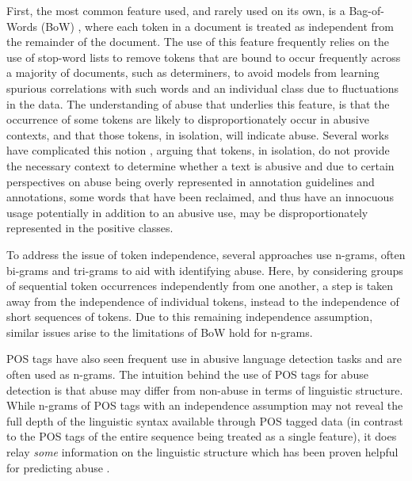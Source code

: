 First, the most common feature used, and rarely used on its own, is a Bag-of-Words (BoW) \citep{Fortuna:2018,Davidson:2017}, where each token in a document is treated as independent from the remainder of the document. The use of this feature frequently relies on the use of stop-word lists to remove tokens that are bound to occur frequently across a majority of documents, such as determiners, to avoid models from learning spurious correlations with such words and an individual class due to fluctuations in the data. The understanding of abuse that underlies this feature, is that the occurrence of some tokens are likely to disproportionately occur in abusive contexts, and that those tokens, in isolation, will indicate abuse. Several works have complicated this notion \citep[e.g.]{Waseem:2018,Davidson:2019}, arguing that tokens, in isolation, do not provide the necessary context to determine whether a text is abusive and due to certain perspectives on abuse being overly represented \citep{Waseem:2016} in annotation guidelines and annotations, some words that have been reclaimed, and thus have an innocuous usage potentially in addition to an abusive use, may be disproportionately represented in the positive classes.

To address the issue of token independence, several approaches use n-grams, often bi-grams \citep{Waseem:2016} and tri-grams \citep{Davidson:2017} to aid with identifying abuse. Here, by considering groups of sequential token occurrences independently from one another, a step is taken away from the independence of individual tokens, instead to the independence of short sequences of tokens. Due to this remaining independence assumption, similar issues arise to the limitations of BoW hold for n-grams.

POS tags have also seen frequent use in abusive language detection tasks \citep{Fortuna:2018} and are often used as n-grams. The intuition behind the use of POS tags for abuse detection is that abuse may differ from non-abuse in terms of linguistic structure. While n-grams of POS tags with an independence assumption may not reveal the full depth of the linguistic syntax available through POS tagged data (in contrast to the POS tags of the entire sequence being treated as a single feature), it does relay \textit{some} information on the linguistic structure which has been proven helpful for predicting abuse \citep{Fortuna:2018}.

